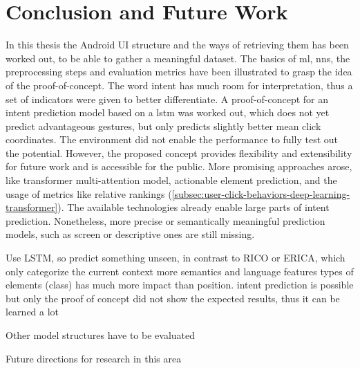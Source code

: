 \chapter{Conclusion and Future Work}
\label{sec:conclusion}

In this thesis the Android UI structure and the ways of retrieving them has been worked out, to be able to gather a meaningful dataset.
The basics of \gls{ml}, \gls{nn}s, the preprocessing steps and evaluation metrics have been illustrated to grasp the idea of the proof-of-concept.
The word intent has much room for interpretation, thus a set of indicators were given to better differentiate.
A proof-of-concept for an intent prediction model based on a \gls{lstm} was worked out, which does not yet predict advantageous gestures, but only predicts slightly better mean click coordinates.
The environment did not enable the performance to fully test out the potential.
However, the proposed concept provides flexibility and extensibility for future work and is accessible for the public.
More promising approaches arose, like transformer multi-attention model, actionable element prediction, and the usage of metrics like relative rankings (\ref{subsec:user-click-behaviors-deep-learning-transformer}).
The available technologies already enable large parts of intent prediction.
Nonetheless, more precise or semantically meaningful prediction models, such as screen or descriptive ones are still missing.


Use LSTM, so predict something unseen, in contrast to RICO or ERICA, which only categorize the current context
more semantics and language features
types of elements (class) has much more impact than position.
intent prediction is possible but only
the proof of concept did not show the expected results, thus it can be learned a lot

Other model structures have to be evaluated




Future directions for research in this area

